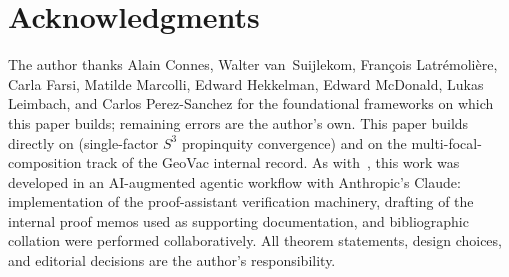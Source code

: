\documentclass[11pt,a4paper]{article}
\theoremstyle{plain}
\theoremstyle{definition}
\newcommand{\sthree}{S^{3}}
\begin{document}
\section*{Acknowledgments}

The author thanks Alain Connes, Walter van~Suijlekom, Fran\c{c}ois
Latr\'emoli\`ere, Carla Farsi, Matilde Marcolli, Edward Hekkelman,
Edward McDonald, Lukas Leimbach, and Carlos Perez-Sanchez for the
foundational frameworks on which this paper builds; remaining errors
are the author's own. This paper builds directly on
\cite{loutey_paper38} (single-factor $\sthree$ propinquity
convergence) and on the multi-focal-composition track of the GeoVac
internal record. As with~\cite{loutey_paper38}, this work was
developed in an AI-augmented agentic workflow with Anthropic's Claude:
implementation of the proof-assistant verification machinery,
drafting of the internal proof memos used as supporting documentation,
and bibliographic collation were performed collaboratively. All
theorem statements, design choices, and editorial decisions are the
author's responsibility.
\end{document}
